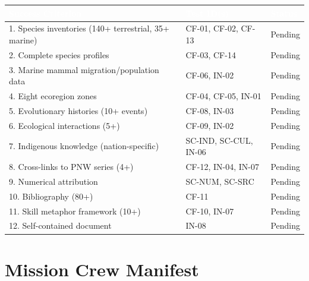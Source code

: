 \documentclass[11pt,letterpaper]{article}
\newcommand{\tableheader}[1]{\textbf{\sffamily\textcolor{white}{#1}}}
\begin{document}
\begin{center}
\small
\begin{tabularx}{\textwidth}{XL{3cm}C{1.3cm}}
\toprule
{}
\tableheader{Success Criterion} & \tableheader{Test ID(s)} & \tableheader{Status} \\
. Species inventories (140+ terrestrial, 35+ marine) & CF-01, CF-02, CF-13 & Pending \\
2. Complete species profiles & CF-03, CF-14 & Pending \\
3. Marine mammal migration/population data & CF-06, IN-02 & Pending \\
4. Eight ecoregion zones & CF-04, CF-05, IN-01 & Pending \\
5. Evolutionary histories (10+ events) & CF-08, IN-03 & Pending \\
6. Ecological interactions (5+) & CF-09, IN-02 & Pending \\
7. Indigenous knowledge (nation-specific) & SC-IND, SC-CUL, IN-06 & Pending \\
8. Cross-links to PNW series (4+) & CF-12, IN-04, IN-07 & Pending \\
9. Numerical attribution & SC-NUM, SC-SRC & Pending \\
10. Bibliography (80+) & CF-11 & Pending \\
11. Skill metaphor framework (10+) & CF-10, IN-07 & Pending \\
12. Self-contained document & IN-08 & Pending \\
\bottomrule
\end{tabularx}
\end{center}

\section{Mission Crew Manifest}
\end{document}
